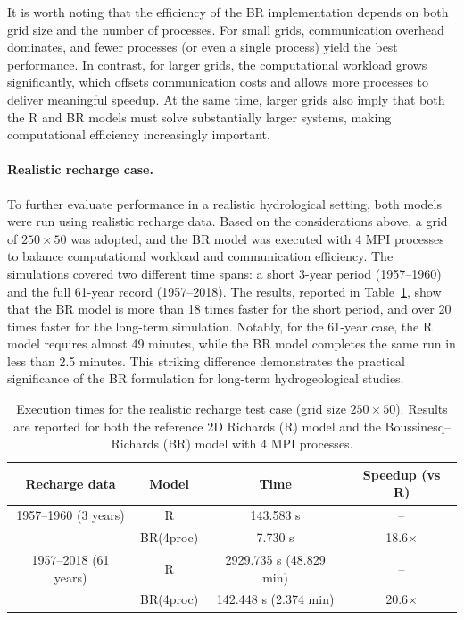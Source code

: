 \documentclass[12pt,a4paper]{article}
\begin{document}
It is worth noting that the efficiency of the BR implementation depends on both grid size and the number of processes.  
For small grids, communication overhead dominates, and fewer processes (or even a single process) yield the best performance.  
In contrast, for larger grids, the computational workload grows significantly, which offsets communication costs and allows more processes to deliver meaningful speedup.  
At the same time, larger grids also imply that both the R and BR models must solve substantially larger systems, making computational efficiency increasingly important.  

\paragraph{Realistic recharge case.}  
To further evaluate performance in a realistic hydrological setting, both models were run using realistic recharge data.  
Based on the considerations above, a grid of $250 \times 50$ was adopted, and the BR model was executed with 4 MPI processes to balance computational workload and communication efficiency.  
The simulations covered two different time spans: a short 3-year period (1957--1960) and the full 61-year record (1957--2018).  
The results, reported in Table~\ref{tab:runtime_realistic}, show that the BR model is more than 18 times faster for the short period, and over 20 times faster for the long-term simulation.  
Notably, for the 61-year case, the R model requires almost 49 minutes, while the BR model completes the same run in less than 2.5 minutes.  
This striking difference demonstrates the practical significance of the BR formulation for long-term hydrogeological studies.  


\begin{table}[H]
\centering
\caption{Execution times for the realistic recharge test case (grid size $250 \times 50$). Results are reported for both the reference 2D Richards (R) model and the Boussinesq–Richards (BR) model with 4 MPI processes.}
\label{tab:runtime_realistic}
\begin{tabular}{c|c|c|c}
\hline
Recharge data & Model & Time & Speedup (vs R) \\
\hline
1957--1960 (3 years) & R  & 143.583 s & -- \\
                     & BR(4proc) & 7.730 s & 18.6$\times$ \\
\hline
1957--2018 (61 years) & R  & 2929.735 s (48.829 min) & -- \\
                      & BR(4proc) & 142.448 s (2.374 min) & 20.6$\times$ \\
\hline
\end{tabular}
\end{table}
\end{document}
